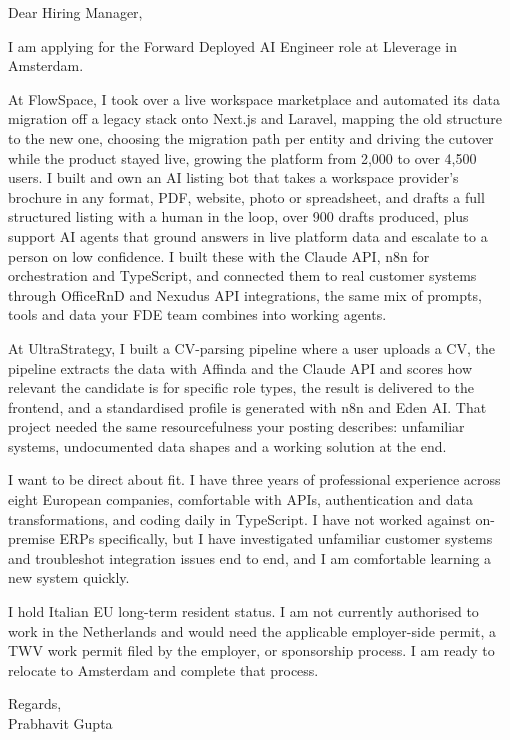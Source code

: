 \documentclass[a4paper,11pt]{article}
\begin{document}
Dear Hiring Manager,

I am applying for the Forward Deployed AI Engineer role at Lleverage in Amsterdam.

At FlowSpace, I took over a live workspace marketplace and automated its data migration off a legacy stack onto Next.js and Laravel, mapping the old structure to the new one, choosing the migration path per entity and driving the cutover while the product stayed live, growing the platform from 2,000 to over 4,500 users. I built and own an AI listing bot that takes a workspace provider's brochure in any format, PDF, website, photo or spreadsheet, and drafts a full structured listing with a human in the loop, over 900 drafts produced, plus support AI agents that ground answers in live platform data and escalate to a person on low confidence. I built these with the Claude API, n8n for orchestration and TypeScript, and connected them to real customer systems through OfficeRnD and Nexudus API integrations, the same mix of prompts, tools and data your FDE team combines into working agents.

At UltraStrategy, I built a CV-parsing pipeline where a user uploads a CV, the pipeline extracts the data with Affinda and the Claude API and scores how relevant the candidate is for specific role types, the result is delivered to the frontend, and a standardised profile is generated with n8n and Eden AI. That project needed the same resourcefulness your posting describes: unfamiliar systems, undocumented data shapes and a working solution at the end.

I want to be direct about fit. I have three years of professional experience across eight European companies, comfortable with APIs, authentication and data transformations, and coding daily in TypeScript. I have not worked against on-premise ERPs specifically, but I have investigated unfamiliar customer systems and troubleshot integration issues end to end, and I am comfortable learning a new system quickly.

I hold Italian EU long-term resident status. I am not currently authorised to work in the Netherlands and would need the applicable employer-side permit, a TWV work permit filed by the employer, or sponsorship process. I am ready to relocate to Amsterdam and complete that process.

Regards,\\
Prabhavit Gupta
\end{document}

